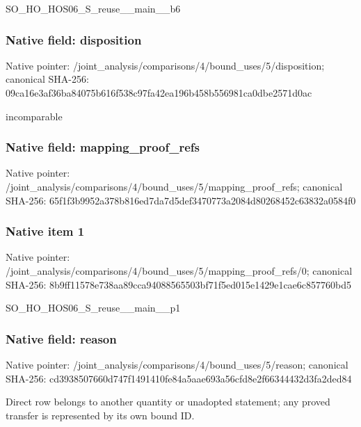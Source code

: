 \documentclass[10pt,a4paper]{article}
\begin{document}
\begingroup\raggedright\sloppy SO\_\allowbreak{}HO\_\allowbreak{}HOS06\_\allowbreak{}S\_\allowbreak{}reuse\_\allowbreak{}\_\allowbreak{}main\_\allowbreak{}\_\allowbreak{}b6\par\endgroup

\subsubsection{Native field: disposition}
Native pointer: /joint\_\allowbreak{}analysis/comparisons/4/bound\_\allowbreak{}uses/5/disposition; canonical SHA-256: 09ca16e3af36ba84075b616f538c97fa42ea196b458b556981ca0dbe2571d0ac

\begingroup\raggedright\sloppy incomparable\par\endgroup

\subsubsection{Native field: mapping\_\allowbreak{}proof\_\allowbreak{}refs}
Native pointer: /joint\_\allowbreak{}analysis/comparisons/4/bound\_\allowbreak{}uses/5/mapping\_\allowbreak{}proof\_\allowbreak{}refs; canonical SHA-256: 65f1f3b9952a378b816ed7da7d5def3470773a2084d80268452c63832a0584f0

\subsubsection{Native item 1}
Native pointer: /joint\_\allowbreak{}analysis/comparisons/4/bound\_\allowbreak{}uses/5/mapping\_\allowbreak{}proof\_\allowbreak{}refs/0; canonical SHA-256: 8b9ff11578e738aa89cca94088565503bf71f5ed015e1429e1cae6c857760bd5

\begingroup\raggedright\sloppy SO\_\allowbreak{}HO\_\allowbreak{}HOS06\_\allowbreak{}S\_\allowbreak{}reuse\_\allowbreak{}\_\allowbreak{}main\_\allowbreak{}\_\allowbreak{}p1\par\endgroup

\subsubsection{Native field: reason}
Native pointer: /joint\_\allowbreak{}analysis/comparisons/4/bound\_\allowbreak{}uses/5/reason; canonical SHA-256: cd3938507660d747f1491410fe84a5aae693a56cfd8e2f66344432d3fa2ded84

\begingroup\raggedright\sloppy Direct row belongs to another quantity or unadopted statement;\allowbreak{} any proved transfer is represented by its own bound ID.\par\endgroup
\end{document}

